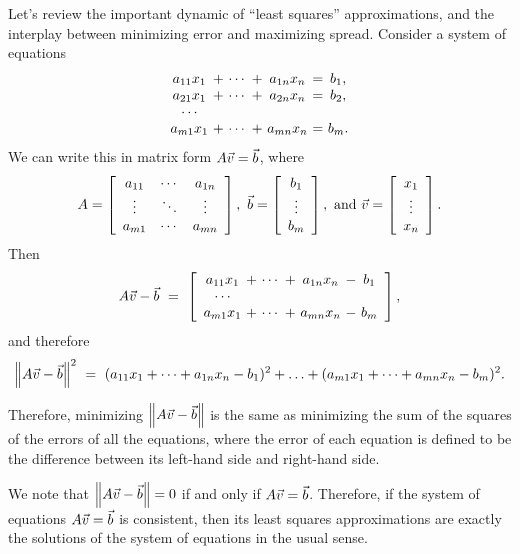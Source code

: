 \documentclass{ximera}
\begin{document}
Let's review the important dynamic of ``least squares'' approximations, and the interplay between minimizing error and maximizing spread. Consider
a system of equations
\begin{equation*}
  \begin{array}{c@{~}c@{~}c@{~}c@{~}c@{~}c@{~}c}
    a_{11}x_1 &+& \cdots &+& a_{1n}x_n &=& b_1, \\
    a_{21}x_1 &+& \cdots &+& a_{2n}x_n &=& b_2, \\
    \cdots  \\
    a_{m1}x_1 &+& \cdots &+& a_{mn}x_n &=& b_m. \\
  \end{array}
\end{equation*}
We can write this in matrix form $A\vect{v}=\vect{b}$, where
\begin{equation*}
  A = \startmat{ccc}
    a_{11} & \cdots & a_{1n} \\
    \vdots & \ddots & \vdots \\
    a_{m1} & \cdots & a_{mn} \\
  \stopmat,
  \quad
  \vect{b} = \startmat{c} b_1 \\ \vdots \\ b_m \stopmat,
  \quad\mbox{and}\quad
  \vect{v} = \startmat{c} x_1 \\ \vdots \\ x_n \stopmat.
\end{equation*}
Then
\begin{equation*}
  A\vect{v} - \vect{b} ~=~
  \startmat{c@{~}c@{~}c@{~}c@{~}c@{~}c@{~}c}
    a_{11}x_1 &+& \cdots &+& a_{1n}x_n &-& b_1 \\
    \cdots \\
    a_{m1}x_1 &+& \cdots &+& a_{mn}x_n &-& b_m \\
  \stopmat,
\end{equation*}
and therefore
\begin{equation*}
  \norm{A\vect{v} - \vect{b}}^2 ~=~
  (a_{11}x_1 + \cdots + a_{1n}x_n - b_1)^2 + \ldots
  + (a_{m1}x_1 + \cdots + a_{mn}x_n - b_m)^2.
\end{equation*}

Therefore, minimizing $\norm{A\vect{v}-\vect{b}}$ is the same as
minimizing the sum of the squares of the errors of all the equations,
where the error of each equation is defined to be the difference
between its left-hand side and right-hand side.

We note that $\norm{A\vect{v}-\vect{b}}=0$ if and only if
$A\vect{v}=\vect{b}$. Therefore, if the system of equations
$A\vect{v}=\vect{b}$ is consistent, then its least squares
approximations are exactly the solutions of the system of equations in
the usual sense.
\end{document}
